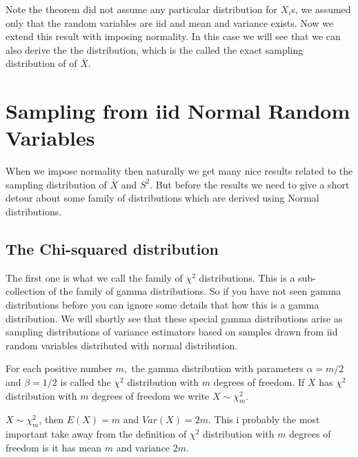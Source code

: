 \documentclass[ 11pt,%
				a4paper,%
				twoside,%
				headinclude,%
				footinclude = true,%
				cleardoublepage = empty,%
				reqno]{scrbook}
\begin{document}
Note the theorem did not assume any particular distribution for $X_{i}$s, we assumed only that the random variables are iid and mean and variance exists. Now we extend this result with imposing normality. In this case we will see that we can  also derive the the distribution, which is the called the exact sampling distribution of of $\bar{X}$.


\section{Sampling from iid Normal Random Variables}

When we impose normality then naturally we get many nice results related to the sampling distribution of $\bar{X}$ and $S^2$. But before the results we need to give a short detour about some family of distributions which are derived using Normal distributions. 




\subsection{The Chi-squared distribution}


The first one is what we call the family of $\chi^2$ distributions. This is a sub-collection of the family of gamma distributions. So if you have not seen gamma distributions before you can ignore some details that how this is a gamma distribution. We will shortly see that these special gamma distributions arise as sampling distributions of variance estimators based on samples drawn from iid random variables distributed with normal distribution.


\begin{definition}
  For each positive number $m,$ the gamma distribution with parameters $\alpha=m / 2$ and $\beta=1 / 2$ is called the $\chi^{2}$ distribution with $m$ degrees of freedom. If $X$ has $\chi^{2}$ distribution with $m$ degrees of freedom we write $X \sim \chi^2_{m}$.

\end{definition}





\begin{remarks}[Moments]
 $X \sim \chi^2_{m}$, then $E(X) = m$ and $Var(X) = 2m$. This i probably the most important take away from the definition of $\chi^{2}$ distribution with $m$ degrees of freedom is it has mean $m$ and variance $2m$. 
\end{remarks}
\end{document}

